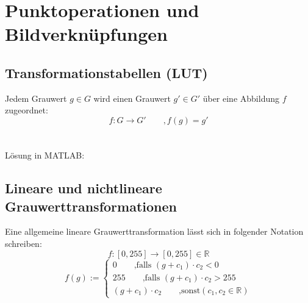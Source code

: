 



\chapter{Punktoperationen und Bildverknüpfungen}

\section{Transformationstabellen (LUT)}

Jedem Grauwert $g \in G$ wird einen Grauwert $g' \in G'$ über eine Abbildung $f$ zugeordnet:
\[
	f:G \rightarrow G' \qquad ,f(g) = g'
\]\\\\
Lösung in MATLAB:
\lstset{language=Matlab}



\section{Lineare und nichtlineare Grauwerttransformationen}
Eine allgemeine lineare Grauwerttransformation lässt sich in folgender Notation schreiben:
\[
	f:[0,255] \rightarrow[0,255] \in \mathbb{R}
\]
\[
	f(g) := \left\lbrace \begin{matrix}
		0 \qquad \text{,falls } (g+c_1) \cdot c_2 < 0\\
		255 \qquad \text{,falls } (g+c_1) \cdot c_2 >255\\
		(g+c_1) \cdot c_2 \qquad \text{,sonst} (c_1, c_2 \in \mathbb{R})
	\end{matrix} \right.
\]

